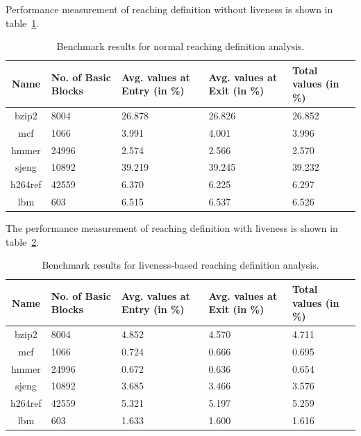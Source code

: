 \documentclass[11pt,a4paper,openright]{report}
\begin{document}
Performance measurement of reaching definition without liveness is shown in table~\ref{tab:performance_without_l}.
\begin{table}[t]
  \begin{center}
    \begin{tabular}{|c|p{1.5cm}|p{2cm}|p{2cm}|p{2cm}|}
    \hline
      Name & No. of Basic Blocks & Avg. values at Entry (in \%) & Avg. values at Exit (in \%) & Total values (in \%)\\
      \hline
   	  bzip2 & 8004 & 26.878 & 26.826 & 26.852 \\ \hline
   	  mcf & 1066 & 3.991 & 4.001 & 3.996 \\ \hline
   	  hmmer & 24996 & 2.574 & 2.566  & 2.570 \\ \hline
   	  sjeng & 10892 & 39.219 & 39.245 & 39.232 \\ \hline
   	  h264ref & 42559 & 6.370 & 6.225 & 6.297\\ \hline
   	  lbm & 603 & 6.515 & 6.537 & 6.526\\ \hline
   	  
	\hline
    \end{tabular}
    \caption{Benchmark results for normal reaching definition analysis.}
      \label{tab:performance_without_l}
  \end{center}
\end{table}



The performance measurement of reaching definition with liveness is shown in table~\ref{tab:performance_with_l}.
\begin{table}[t]
  \begin{center}
    \begin{tabular}{|c|p{1.5cm}|p{2cm}|p{2cm}|p{2cm}|}
    \hline
      Name & No. of Basic Blocks & Avg. values at Entry (in \%) & Avg. values at Exit (in \%) & Total values (in \%)\\
      \hline
   	  bzip2 & 8004 & 4.852 & 4.570 & 4.711 \\ \hline
   	  mcf & 1066 & 0.724 & 0.666 & 0.695 \\ \hline
   	  hmmer & 24996 & 0.672 & 0.636  & 0.654 \\ \hline
   	  sjeng & 10892 & 3.685 & 3.466 & 3.576 \\ \hline
   	  h264ref & 42559 & 5.321 & 5.197 & 5.259\\ \hline
   	  lbm & 603 & 1.633 & 1.600 & 1.616\\ \hline
   	  
	\hline
    \end{tabular}
    \caption{Benchmark results for liveness-based reaching definition analysis.}
      \label{tab:performance_with_l}
  \end{center}
\end{table}
\end{document}
